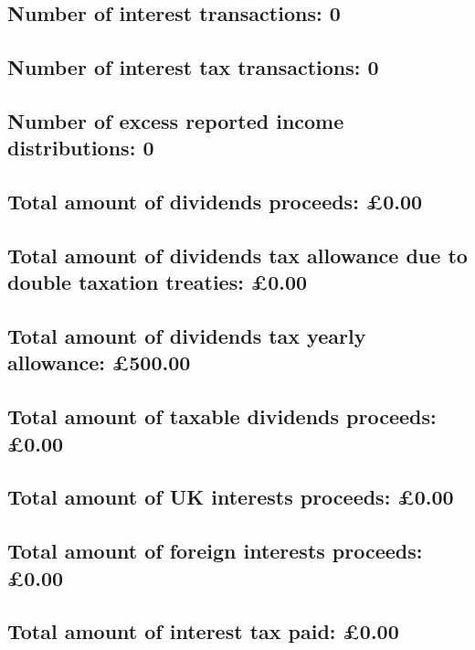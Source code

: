 \documentclass{article}
\begin{document}
\subsection*{Number of interest transactions: 0}
\subsection*{Number of interest tax transactions: 0}
\subsection*{Number of excess reported income distributions: 0}
\subsection*{Total amount of dividends proceeds: £0.00}
\subsection*{Total amount of dividends tax allowance due to double taxation treaties: £0.00}
\subsection*{Total amount of dividends tax yearly allowance: £500.00}
\subsection*{Total amount of taxable dividends proceeds: £0.00}
\subsection*{Total amount of UK interests proceeds: £0.00}
\subsection*{Total amount of foreign interests proceeds: £0.00}
\subsection*{Total amount of interest tax paid: £0.00}
\end{document}
